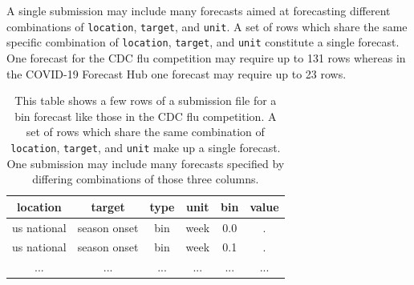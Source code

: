 \documentclass[11pt,notitlepage]{isuthesis}
\begin{document}
A single submission may include many forecasts aimed at forecasting 
different combinations of \texttt{location}, \texttt{target}, and \texttt{unit}. 
A set of rows which share
the same specific combination of \texttt{location}, \texttt{target}, and 
\texttt{unit} constitute a single forecast. One forecast for the CDC flu
competition may require up to 131 rows whereas in the COVID-19 Forecast Hub one 
forecast may require up to 23 rows.


\begin{table}[h!]
\begin{center}
\begin{minipage}{10cm}
\captionsetup{font=scriptsize}
\centering
 \begin{tabular}{|c|c|c|c|c|c|}
 \hline
    location & target & type & unit & bin & value  \\ \hline
    us national & season onset & bin & week & 0.0 & . \\
    us national & season onset & bin & week & 0.1 & . \\
    ... & ... & ... & ... & ... & ... \\
 \hline
 \end{tabular}
 \caption[Influenza competition submission example]{This table 
 shows a few rows of a 
 submission file
 for a bin forecast like those in the CDC flu 
 competition. A set of rows which share the same combination of 
 \texttt{location}, \texttt{target}, and \texttt{unit} make up a
 single forecast. One submission may include many forecasts specified by 
 differing combinations of those three columns.}
 \label{table:dstan}
 \end{minipage}
 \end{center}
\end{table}
\end{document}
